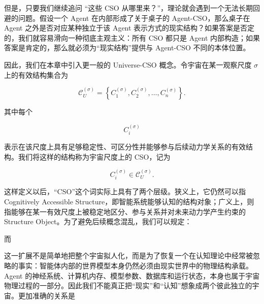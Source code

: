 但是，只要我们继续追问 ``这些 CSO 从哪里来？''，理论就会遇到一个无法长期回避的问题。假设一个 Agent 在内部形成了关于桌子的 Agent-CSO，那么桌子在 Agent 之外是否对应某种独立于该 Agent 表示方式的现实结构？如果答案是否定的，我们就容易滑向一种彻底主观主义：所有 CSO 都只是 Agent 内部构造；如果答案是肯定的，那么就必须为“现实结构”提供与 Agent-CSO 不同的本体位置。

因此，我们在本章中引入更一般的 Universe-CSO 概念。令宇宙在某一观察尺度 $\sigma$ 上的有效结构集合为

\[
\mathcal{C}_{U}^{(\sigma)}
=
\left\{
C_{1}^{(\sigma)},
C_{2}^{(\sigma)},
\ldots,
C_{n}^{(\sigma)}
\right\}.
\]

其中每个

\[
C_i^{(\sigma)}
\]

表示在该尺度上具有足够稳定性、可区分性并能够参与后续动力学关系的有效结构。我们将这样的结构称为宇宙尺度上的 CSO，记为

\[
\boxed{
C_i^{(\sigma)}
\in
\mathcal{C}_{U}^{(\sigma)}.
}
\]

这样定义以后，“CSO”这个词实际上具有了两个层级。狭义上，它仍然可以指 Cognitively Accessible Structure，即智能系统能够认知的结构对象；广义上，则指能够在某一有效尺度上被稳定地区分、参与关系并对未来动力学产生约束的 Structure Object。为了避免后续概念混乱，我们可以规定：

\begin{statementbox}
\centering
{}
\end{statementbox}

而

\begin{statementbox}
\centering
{}
\end{statementbox}

这一扩展不是简单地把整个宇宙拟人化，而是为了恢复一个在认知理论中经常被忽略的事实：智能体内部的世界模型本身仍然必须由现实世界中的物理结构承载。Agent 的神经系统、计算机内存、模型参数、数据库和运行状态，本身也属于宇宙物理过程的一部分。因此我们不能真正把“现实”和“认知”想象成两个彼此独立的宇宙。更加准确的关系是

\begin{statementbox}
\centering
{}
\end{statementbox}

